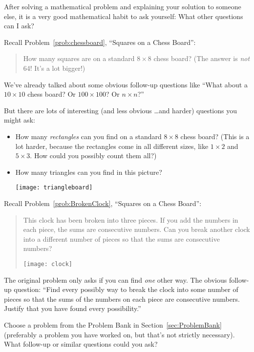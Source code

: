 After solving a mathematical problem and explaining your solution to someone else, it is a very good mathematical habit to ask yourself: What other questions can I ask?

\begin{example}
Recall Problem~\ref{prob:chessboard}, ``Squares on a Chess Board'':

\begin{quote}
How many squares are on a standard $8 \times 8$ chess board?  (The answer is \emph{not} 64!  It's a lot bigger!)
\end{quote}

We've already talked about some obvious follow-up questions like ``What about a $10 \times 10$ chess board?  Or $100 \times 100$?  Or $n \times n$?''

But there are lots of interesting (and less obvious \dots and harder) questions you might ask:
\begin{itemize}
\item
How many \emph{rectangles} can you find on a standard $8 \times 8$ chess board?  (This is a lot harder, because the rectangles come in all different sizes, like $1 \times 2$ and $5 \times 3$.  How could you possibly count them all?)
\item
How many triangles can you find in this picture?
\begin{center}
\texttt{[image: triangleboard]}
\end{center}

\end{itemize}

\end{example}

\begin{example}
Recall Problem~\ref{prob:BrokenClock}, ``Squares on a Chess Board'':

\begin{quote}
 This clock has been broken into three pieces.  If you add the numbers in each piece, the sums are consecutive numbers.  Can you break another clock into a different number of pieces so that the sums are consecutive numbers?  
 \begin{center}
\texttt{[image: clock]}
\end{center}

\end{quote}

The original problem only asks if you can find \emph{one} other way.  The obvious follow-up question: ``Find every possibly way to break the clock into some number of pieces so that the sums of the numbers on each piece are consecutive numbers.  Justify that you have found every possibility.'' 
\end{example}


\begin{thinkpair*}
Choose a problem from the Problem Bank in Section~\ref{sec:ProblemBank} (preferably a problem you have worked on, but that's not strictly necessary).  What follow-up or similar questions could you ask?

\end{thinkpair*}



  
